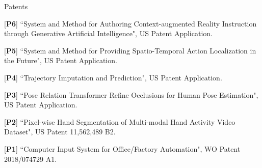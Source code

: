 \begin{cventries}
\vspace{-.5em}
\cvpub
{Patents}{
\begin{cvitems}
    \item {[\textbf{P6}] ``System and Method for Authoring Context-augmented Reality Instruction through Generative Artificial Intelligence", US Patent Application.}
    \item {[\textbf{P5}] ``System and Method for Providing Spatio-Temporal Action Localization in the Future", US Patent Application.}
    \item {[\textbf{P4}] ``Trajectory Imputation and Prediction", US Patent Application.}
    \item {[\textbf{P3}] ``Pose Relation Transformer Refine Occlusions for Human Pose Estimation", US Patent Application.}
    \item {[\textbf{P2}] ``Pixel-wise Hand Segmentation of Multi-modal Hand Activity Video Dataset", US Patent 11,562,489 B2.}
    \item {[\textbf{P1}] ``Computer Input System for Office/Factory Automation", WO Patent 2018/074729 A1.}
\end{cvitems}
}


\end{cventries}
